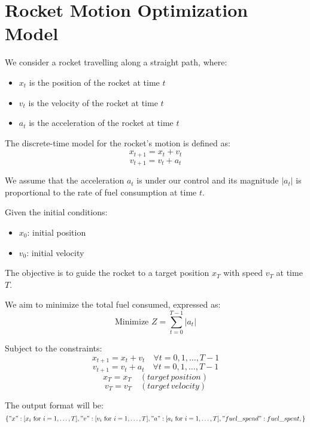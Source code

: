 \documentclass{article}
\begin{document}
\section*{Rocket Motion Optimization Model}

We consider a rocket travelling along a straight path, where:
\begin{itemize}
    \item \( x_t \) is the position of the rocket at time \( t \)
    \item \( v_t \) is the velocity of the rocket at time \( t \)
    \item \( a_t \) is the acceleration of the rocket at time \( t \)
\end{itemize}

The discrete-time model for the rocket's motion is defined as:
\[
x_{t+1} = x_t + v_t
\]
\[
v_{t+1} = v_t + a_t
\]

We assume that the acceleration \( a_t \) is under our control and its magnitude \( |a_t| \) is proportional to the rate of fuel consumption at time \( t \).

Given the initial conditions:
\begin{itemize}
    \item \( x_0 \): initial position
    \item \( v_0 \): initial velocity
\end{itemize}

The objective is to guide the rocket to a target position \( x_T \) with speed \( v_T \) at time \( T \).

We aim to minimize the total fuel consumed, expressed as:
\[
\text{Minimize } Z = \sum_{t=0}^{T-1} |a_t|
\]

Subject to the constraints:
\[
x_{t+1} = x_t + v_t \quad \forall t = 0, 1, \ldots, T-1 
\]
\[
v_{t+1} = v_t + a_t \quad \forall t = 0, 1, \ldots, T-1 
\]
\[
x_T = x_T \quad (target \, position)
\]
\[
v_T = v_T \quad (target \, velocity)
\]

The output format will be:
\[
\{
    "x": [x_i \text{ for } i=1, \ldots, T],
    "v": [v_i \text{ for } i=1, \ldots, T],
    "a": [a_i \text{ for } i=1, \ldots, T],
    "fuel\_spend": fuel\_spent,
\}
\]
\end{document}
